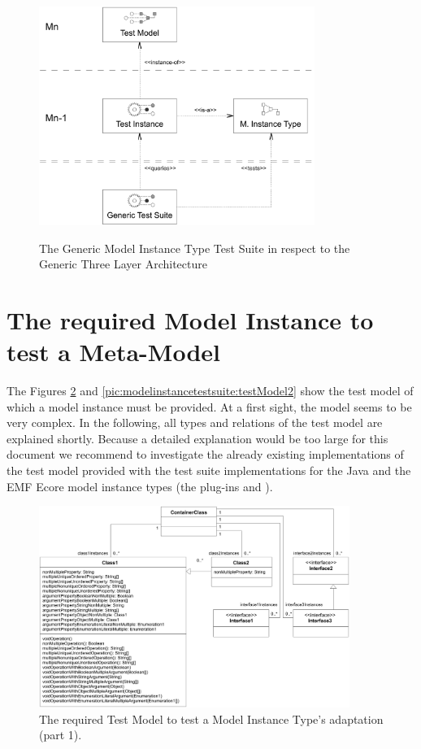 \begin{figure}[!t]
	\centering
		\includegraphics[width=0.80\textwidth]{figures/modelinstancetestsuite/genericTestSuite.pdf}
	\label{pic:modelinstancetestsuite:genericTestSuite}
	\caption{The Generic Model Instance Type Test Suite in respect to the Generic Three Layer Ar\-chi\-tec\-ture}
\end{figure}



\section{The required Model Instance to test a Meta-Model}

The Figures \ref{pic:modelinstancetestsuite:testModel1} and \ref{pic:modelinstancetestsuite:testModel2} show the test model of which a model instance must be provided. At a first sight, the model seems to be very complex. In the following, all types and relations of the test model are explained shortly. Because a detailed explanation would be too large for this document we recommend to investigate the already existing implementations of the test model provided with the test suite implementations for the Java and the \acs{EMF} Ecore model instance types (the plug-ins  and ).

\begin{figure}
	\includegraphics[width=0.9\textwidth]{figures/modelinstancetestsuite/testModel01.pdf}
	\caption{The required Test Model to test a Model Instance Type's adaptation (part 1).}
	\label{pic:modelinstancetestsuite:testModel1}
\end{figure}

